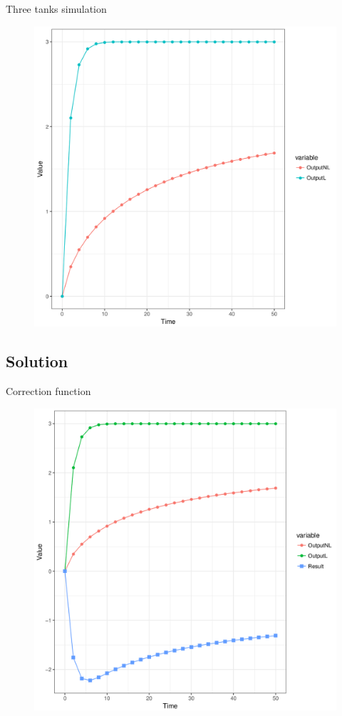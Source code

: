\documentclass{beamer}
\begin{document}
\begin{frame}{Three tanks simulation}
	\begin{figure}
		\centering
		\includegraphics[height=0.8\textheight]{3tanks_simulation.png}
	\end{figure}
\end{frame}

\subsection{Solution}
\begin{frame}{Correction function}
	\begin{figure}
		\centering
		\includegraphics[height=0.8\textheight]{3tanks_correction.png}
	\end{figure}
\end{frame}
\end{document}
